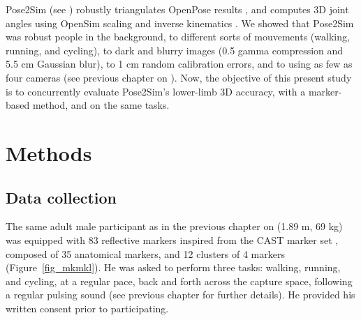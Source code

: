 Pose2Sim (see  \cite{Pagnon2022b}) robustly triangulates OpenPose results \cite{Cao2019}, and computes 3D joint angles using OpenSim scaling and inverse kinematics \cite{Delp2007, Seth2018}. We showed that Pose2Sim was robust people in the background, to different sorts of mouvements (walking, running, and cycling), to dark and blurry images (0.5 gamma compression and 5.5 cm Gaussian blur), to 1 cm random calibration errors, and to using as few as four cameras (see previous chapter on  \cite{Pagnon2021}). Now, the objective of this present study is to concurrently evaluate Pose2Sim’s lower-limb 3D accuracy, with a marker-based method, and on the same tasks.


\section{Methods}\label{sec:accuracy_methods}
\subsection{Data collection}

The same adult male participant as in the previous chapter on  (1.89 m, 69 kg) was equipped with 83 reflective markers inspired from the CAST marker set \cite{Cappozzo1995}, composed of 35 anatomical markers, and 12 clusters of 4 markers (Figure~\ref{fig_mkmkl}). He was asked to perform three tasks: walking, running, and cycling, at a regular pace, back and forth across the capture space, following a regular pulsing sound (see previous chapter for further details). He provided his written consent prior to participating.

